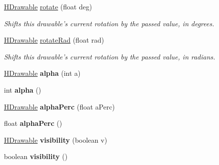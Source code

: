 \begin{DoxyCompactItemize}
\item 
\hyperlink{classhype_1_1drawable_1_1_h_drawable}{H\-Drawable} \hyperlink{classhype_1_1drawable_1_1_h_drawable_a8653551b0b72c984441c981240339933}{rotate} (float deg)
\begin{DoxyCompactList}\small\item\em Shifts this drawable's current rotation by the passed value, in degrees. \end{DoxyCompactList}\item 
\hyperlink{classhype_1_1drawable_1_1_h_drawable}{H\-Drawable} \hyperlink{classhype_1_1drawable_1_1_h_drawable_a6e123a6ba9376fbc08d1b622bfcfeb95}{rotate\-Rad} (float rad)
\begin{DoxyCompactList}\small\item\em Shifts this drawable's current rotation by the passed value, in radians. \end{DoxyCompactList}\item 
\hypertarget{classhype_1_1drawable_1_1_h_drawable_a03c7275f5caab5cc9034b18d4c2f1305}{\hyperlink{classhype_1_1drawable_1_1_h_drawable}{H\-Drawable} {\bfseries alpha} (int a)}\label{classhype_1_1drawable_1_1_h_drawable_a03c7275f5caab5cc9034b18d4c2f1305}

\item 
\hypertarget{classhype_1_1drawable_1_1_h_drawable_a3cdefeadb2538268501043a0ca07177e}{int {\bfseries alpha} ()}\label{classhype_1_1drawable_1_1_h_drawable_a3cdefeadb2538268501043a0ca07177e}

\item 
\hypertarget{classhype_1_1drawable_1_1_h_drawable_a0b94a8de9bf539f1d5a16fcdea544fbb}{\hyperlink{classhype_1_1drawable_1_1_h_drawable}{H\-Drawable} {\bfseries alpha\-Perc} (float a\-Perc)}\label{classhype_1_1drawable_1_1_h_drawable_a0b94a8de9bf539f1d5a16fcdea544fbb}

\item 
\hypertarget{classhype_1_1drawable_1_1_h_drawable_a6c3f8eae8eeaa68ee76003d732b99bac}{float {\bfseries alpha\-Perc} ()}\label{classhype_1_1drawable_1_1_h_drawable_a6c3f8eae8eeaa68ee76003d732b99bac}

\item 
\hypertarget{classhype_1_1drawable_1_1_h_drawable_a6417fd46b70ffc329969f6c492f652e4}{\hyperlink{classhype_1_1drawable_1_1_h_drawable}{H\-Drawable} {\bfseries visibility} (boolean v)}\label{classhype_1_1drawable_1_1_h_drawable_a6417fd46b70ffc329969f6c492f652e4}

\item 
\hypertarget{classhype_1_1drawable_1_1_h_drawable_aa79392f2459864795224477e941618cc}{boolean {\bfseries visibility} ()}\label{classhype_1_1drawable_1_1_h_drawable_aa79392f2459864795224477e941618cc}


\end{DoxyCompactItemize}
